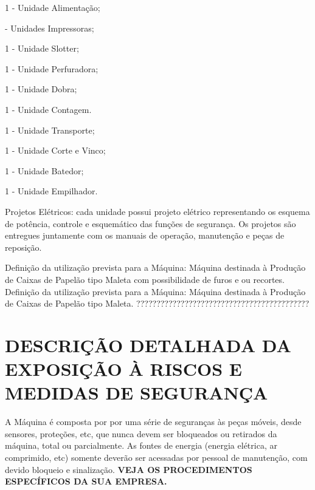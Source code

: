 \begin{machinePartsList}
    \item[\ding{\dingNumber}] 1 - Unidade Alimentação;
    \item[\ding{\dingNumber}] \numberOfPrinters \space - Unidades Impressoras;
    \ifmachineType
        \item[\ding{\dingNumber}] 1 - Unidade Slotter;
        \ifunidadePerfuradora
        \item[\ding{\dingNumber}] 1 - Unidade Perfuradora;
        \fi
        \item[\ding{\dingNumber}] 1 - Unidade Dobra;
        \item[\ding{\dingNumber}] 1 - Unidade Contagem.
    \else
        \item[\ding{\dingNumber}] 1 - Unidade Transporte;
        \item[\ding{\dingNumber}] 1 - Unidade Corte e Vinco;
        \item[\ding{\dingNumber}] 1 - Unidade Batedor;
        \item[\ding{\dingNumber}] 1 - Unidade Empilhador.
    \fi
\end{machinePartsList}

Projetos Elétricos: cada unidade possui projeto elétrico representando os esquema de potência, controle e esquemático das
 funções de segurança. Os projetos são entregues juntamente com os manuais de operação, manutenção e
 peças de reposição.

 \ifmachineType

  \ifunidadePerfuradora
       Definição da utilização prevista para a Máquina:
 Máquina destinada à Produção de Caixas de Papelão tipo Maleta com possibilidade de furos e ou recortes.
 \else
 Definição da utilização prevista para a Máquina:
 Máquina destinada à Produção de Caixas de Papelão tipo Maleta.
    \fi
\else
???????????????????????????????????????????
\fi

\newpage

\thispagestyle{fancy}

\vspace*{40 pt}

\section{\large{\MakeUppercase{Descrição detalhada da Exposição à Riscos e Medidas de Segurança}}}

A Máquina é composta por por uma série de seguranças às peças móveis, desde sensores, proteções, etc, que nunca devem
ser bloqueados ou retirados da máquina, total ou parcialmente. As fontes de energia (energia elétrica, ar comprimido, etc)
somente deverão ser acessadas por pessoal de manutenção, com devido bloqueio e sinalização.
\textbf{VEJA OS PROCEDIMENTOS ESPECÍFICOS DA SUA EMPRESA.}

